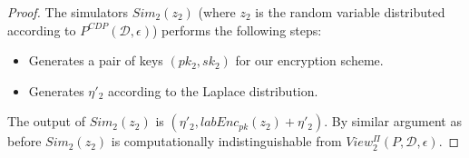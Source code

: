 \begin{proof}
The simulators $Sim_2 (z_2)$ (where $z_2$ is the random
variable distributed according to $P^{CDP}(\mathcal{D},\epsilon)$) performs the following steps:
\begin{itemize}
\item Generates a pair of keys $(pk_2,sk_2)$ for our encryption scheme.

\item Generates $\eta'_2$ according to the Laplace distribution.
\end{itemize}
The output of $Sim_2 (z_2)$ is $(\eta'_2,labEnc_{pk}(z_2)+\eta'_2)$.
By similar argument as before $Sim_2 (z_2)$ is computationally indistinguishable 
from $View_2^{\Pi}(P,\mathcal{D},\epsilon)$.
\end{proof}











